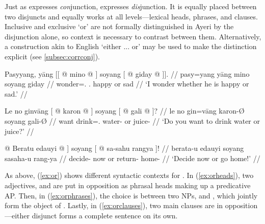 

Just as  expresses \emph{con}junction,  
expresses \emph{dis}junction. It is equally placed between two disjuncts and 
equally works at all levels---lexical heads, phrases, and clauses. Inclusive 
and exclusive `or' are not formally distinguished in Ayeri by the disjunction 
 alone, so context is necessary to contrast between them. 
Alternatively, a construction akin to English `either ... or' may be used to 
make the distinction explicit (see \autoref{subsec:corrconj}).

\pex\label{ex:or}
\a\label{ex:orheads}\begingl
	\gla Pasyyang, yāng {\normalfont [[} @ mino @ 
		{\normalfont ]} soyang {\normalfont [} @ giday @ 
		{\normalfont ]].} //
	\glb pasy=yang yāng {} mino {} soyang {} giday {} //
	\glc wonder=\Fsg{}.\Aarg{} \TsgM{}.\Aarg{} {} happy {} or {} sad {} //
	\glft `I wonder whether he is happy or sad.' //
\endgl

\a\label{ex:orphrases}\begingl
	\gla Le no ginvāng {\normalfont [} @ karon @ {\normalfont ]} 
		soyang {\normalfont [} @ gali @ {\normalfont ]?} //
	\glb le no gin=vāng {} karon-Ø {} soyang {} gali-Ø {} //
	\glc \PatTI{} want drink=\Ssg{}.\Aarg{} {} water-\Top{} {} or {} 
		juice-\Top{} {} //
	\glft `Do you want to drink water or juice?' //
\endgl

\a\label{ex:orclauses}\begingl
	\gla {\normalfont [\tsup{S}} @ Beratu edauyi @ {\normalfont ]} soyang
		{\normalfont [} @ sa-sahu rangya {\normalfont ]!} //
	\glb {} berata-u edauyi {} soyang {} sa\til{}saha-u rang-ya {} //
	\glc {} decide-\Imp{} now {} or {} return-\Imp{} home-\Loc{} {} //
	\glft `Decide now or go home!' //
\endgl

\xe

As above, (\ref{ex:or}) shows different syntactic contexts for 
. In (\ref{ex:orheads}), two adjectives, 
 and  are put in opposition as
phrasal heads making up a predicative AP. Then, in (\ref{ex:orphrases}), the
choice is between two NPs,  and
, which jointly form the object of 
. Lastly, in (\ref{ex:orclauses}), two main 
clauses are in opposition---either disjunct forms a complete sentence on its 
own.

